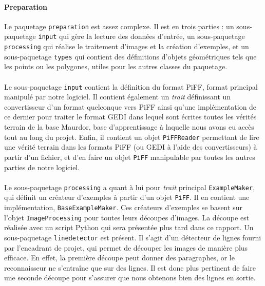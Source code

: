 \paragraph{Preparation}
Le paquetage \texttt{preparation} est assez complexe. Il est en trois parties : un sous-paquetage \texttt{input} qui gère la lecture des données d'entrée, un sous-paquetage \texttt{processing} qui réalise le traitement d'images et la création d'exemples, et un sous-paquetage \texttt{types} qui contient des définitions d'objets géométriques tels que les points ou les polygones, utiles pour les autres classes du paquetage.

\paragraph{}
Le sous-paquetage \texttt{input} contient la définition du format PiFF, format principal manipulé par notre logiciel. Il contient également un \textit{trait} définissant un convertisseur d'un format quelconque vers PiFF ainsi qu'une implémentation de ce dernier pour traiter le format GEDI dans lequel sont écrites toutes les vérités terrain de la base Maurdor, base d'apprentissage à laquelle nous avons eu accès tout au long du projet. Enfin, il contient un objet \texttt{PiFFReader} permettant de lire une vérité terrain dans les formats PiFF (ou GEDI à l'aide des convertisseurs) à partir d'un fichier, et d'en faire un objet \texttt{PiFF} manipulable par toutes les autres parties de notre logiciel.

\paragraph{}
Le sous-paquetage \texttt{processing} a quant à lui pour \textit{trait} principal \texttt{ExampleMaker}, qui définit un créateur d'exemples à partir d'un objet \texttt{PiFF}. Il en contient une implémentation, \texttt{BaseExampleMaker}. Ces créateurs d'exemples se basent sur l'objet \texttt{ImageProcessing} pour toutes leurs découpes d'images. La découpe est réalisée avec un script Python qui sera présentée plus tard dans ce rapport. Un sous-paquetage \texttt{linedetector} est présent. Il s'agit d'un détecteur de lignes fourni par l'encadrant de projet, qui permet de découper les images de manière plus efficace. En effet, la première découpe peut donner des paragraphes, or le reconnaisseur ne s'entraîne que sur des lignes. Il est donc plus pertinent de faire une seconde découpe pour s'assurer que nous obtenons bien des lignes en sortie.

